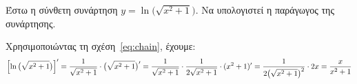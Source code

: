 \documentclass[a4paper,table]{report}
\newcommand{\twocolumnsiderrr}[2]{\begin{minipage}[c]{0.80\linewidth}
    #1
    \end{minipage}\hfill\begin{minipage}[c]{0.15\linewidth}
    #2
  \end{minipage}
}
\begin{document}
  \begin{exercise}
    Έστω η σύνθετη συνάρτηση $ y= \ln{\bigl(\sqrt{x^{2}+1}\bigr)} $. 
    Να υπολογιστεί η παράγωγος της συνάρτησης.  
  \end{exercise}
  \begin{solution}
    Χρησιμοποιώντας τη σχέση~\eqref{eq:chain}, έχουμε:
    \[
      \Bigl[\ln{\bigl(\sqrt{x^{2}+1}\bigr)} \Bigr]' = \frac{1}{\sqrt{x^{2}+1}} \cdot 
      \bigl(\sqrt{x^{2}+1} \bigr)' = \frac{1}{\sqrt{x^{2}+1}} \cdot 
      \frac{1}{2 \sqrt{x^{2}+1}} \cdot (x^{2}+1)' = \frac{1}{2 
      \bigl(\sqrt{x^{2}+1}\bigr)^{2}} \cdot 2x = \frac{x}{x^{2}+1}
    \]  

  \end{solution}
\end{document}
